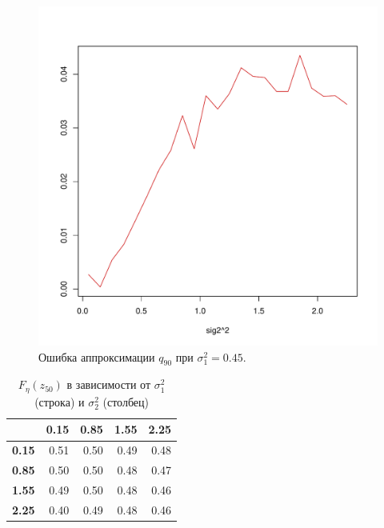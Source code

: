\documentclass[12pt]{article}
\begin{document}
\begin{figure}[!hhh]
	\begin{center}
		\begin{minipage}[h]{0.8\linewidth}
			\includegraphics[width=1\linewidth]{img/gr_new_3.pdf}
			\caption{Ошибка аппроксимации $q_{90}$ при $\sigma_{1}^{2} = 0.45$.} %
			\label{ris9} %
		\end{minipage}	
	\end{center}
\end{figure}
	
	
	\begin{table}[!hhh]
		\centering
		\caption{$F_{\eta}(z_{50})$ в зависимости от $\sigma_{1}^{2}$ (строка) и $\sigma_{2}^{2}$ (столбец)  }
		\label{tab4}
		\begin{tabular}{rrrrr}
			\hline
			& \textbf{0.15} & \textbf{0.85} & \textbf{1.55} & \textbf{2.25} \\
			\hline
			\textbf{0.15} & 0.51 & 0.50 & 0.49 & 0.48 \\ 
			\textbf{0.85} & 0.50 & 0.50 & 0.48 & 0.47 \\ 
			\textbf{1.55} & 0.49 & 0.50 & 0.48 & 0.46 \\ 
			\textbf{2.25} & 0.40 & 0.49 & 0.48 & 0.46 \\ 
			\hline
		\end{tabular}
	\end{table}
	
\end{document}

